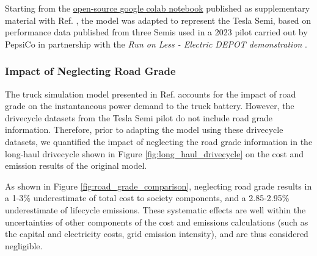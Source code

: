 Starting from the \href{https://colab.research.google.com/drive/124rFu_4vHx4cP6SODtdzCxnUmLY50wbW?usp=sharing}{open-source google colab notebook} published as supplementary material with Ref. \cite{Sader_2023}, the model was adapted to represent the Tesla Semi, based on performance data published from three Semis used in a 2023 pilot carried out by PepsiCo in partnership with the \textit{Run on Less - Electric DEPOT demonstration} \cite{NACFE_2023}. 

\subsubsection{Impact of Neglecting Road Grade}

The truck simulation model presented in Ref. \cite{Sader_2023} accounts for the impact of road grade on the instantaneous power demand to the truck battery. However, the drivecycle datasets from the Tesla Semi pilot do not include road grade information. Therefore, prior to adapting the model using these drivecycle datasets, we quantified the impact of neglecting the road grade information in the long-haul drivecycle shown in Figure \ref{fig:long_haul_drivecycle} on the cost and emission results of the original model. 

As shown in Figure \ref{fig:road_grade_comparison}, neglecting road grade results in a 1-3\% underestimate of total cost to society components, and a 2.85-2.95\% underestimate of lifecycle emissions. These systematic effects are well within the uncertainties of other components of the cost and emissions calculations (such as the capital and electricity costs, grid emission intensity), and are thus considered negligible. 

